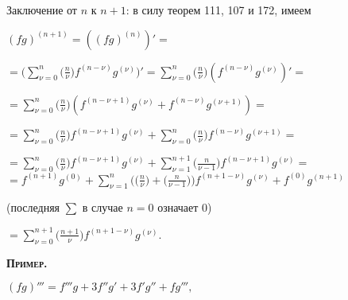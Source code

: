 \footnotesize
{}
\linespread{1}
\normalsize
Заключение от $n$ к $n+1$: в силу теорем 111, 107 и 172, имеем
\begin{center}
$(fg)^{(n+1)}=((fg)^{(n)})'=$
\end{center}
\begin{left}
\;\;\;\;\;\;\;\;\;\;\;\;\;\;$=\Big(\sum\limits^n_{\nu=0}\Big(\frac{n}{\nu}\Big)f^{(n-\nu)}g^{(\nu)}\Big)'=\sum\limits^n_{\nu=0}\Big(\frac{n}{\nu}\Big)(f^{(n-\nu)}g^{(\nu)})'=$
\end{left}
\newline
\newline
\begin{left}
\;\;\;\;\;\;\;\;\;\;\;\;\;\;$=\sum\limits^n_{\nu=0}\Big(\frac{n}{\nu}\Big)(f^{(n-\nu+1)}g^{(\nu)}+f^{(n-\nu)}g^{(\nu+1)})=$
\end{left}
\newline
\newline
\begin{left}
\;\;\;\;\;\;\;\;\;\;\;\;\;\;$=\sum\limits^n_{\nu=0}\Big(\frac{n}{\nu}\Big)f^{(n-\nu+1)}g^{(\nu)}+\sum\limits^n_{\nu=0}\Big(\frac{n}{\nu}\Big)f^{(n-\nu)}g^{(\nu+1)}=$
\end{left}
\newline
\newline
\begin{left}
\;\;\;\;\;\;\;\;\;\;\;\;\;\;$=\sum\limits^n_{\nu=0}\Big(\frac{n}{\nu}\Big)f^{(n-\nu+1)}g^{(\nu)}+\sum\limits^{n+1}_{\nu=1}\Big(\frac{n}{\nu-1}\Big)f^{(n-\nu+1)}g^{(\nu)}=$
\newline
\newline
$=f^{(n+1)}g^{(0)}+\sum\limits^n_{\nu=1}\Big(\Big(\frac{n}{\nu}\Big)+\Big(\frac{n}{\nu-1}\Big)\Big)f^{(n+1-\nu)}g^{(\nu)}+f^{(0)}g^{(n+1)}$
\end{left}
\newline
\newline
(последняя $\sum$ в случае $n=0$ означает 0)
\newline
\newline
\begin{left}
\;\;\;\;\;\;\;\;\;\;\;\;\;\;$=\sum\limits^{n+1}_{\nu=0}\Big(\frac{n+1}{\nu}\Big)f^{(n+1-\nu)}g^{(\nu)}$.
\end{left}
\newline
\newline
\begin{left}\;\;\;\;\small{\textsf{\textbf{\textsc{Пример.}}}}\end{left}
\begin{center}
$(fg)'''=f'''g+3f''g'+3f'g''+fg''',$
\end{center}
